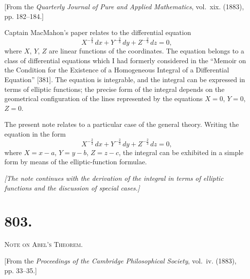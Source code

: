 \documentclass[11pt,a4paper]{book}
\begin{document}
\begin{flushright}
\small[From the \textit{Quarterly Journal of Pure and Applied Mathematics}, vol.~xix. (1883),\\
pp. 182--184.]
\end{flushright}

Captain MacMahon's paper relates to the differential equation
\[
X^{-\frac{2}{3}}\,dx + Y^{-\frac{2}{3}}\,dy + Z^{-\frac{2}{3}}\,dz = 0,
\]
where $X$, $Y$, $Z$ are linear functions of the coordinates. The equation belongs to a class of differential equations which I had formerly considered in the ``Memoir on the Condition for the Existence of a Homogeneous Integral of a Differential Equation'' [381]. The equation is integrable, and the integral can be expressed in terms of elliptic functions; the precise form of the integral depends on the geometrical configuration of the lines represented by the equations $X=0$, $Y=0$, $Z=0$.

The present note relates to a particular case of the general theory. Writing the equation in the form
\[
X^{-\frac{2}{3}}\,dx + Y^{-\frac{2}{3}}\,dy + Z^{-\frac{2}{3}}\,dz = 0,
\]
where $X = x - a$, $Y = y - b$, $Z = z - c$, the integral can be exhibited in a simple form by means of the elliptic-function formulae.

\vspace{0.5cm}
\noindent\textit{[The note continues with the derivation of the integral in terms of elliptic functions and the discussion of special cases.]}
\vspace{0.5cm}



\newpage
\section*{803.}
\begin{center}
{\large\scshape Note on Abel's Theorem.}
\end{center}

\begin{flushright}
\small[From the \textit{Proceedings of the Cambridge Philosophical Society}, vol.~iv. (1883),\\
pp. 33--35.]
\end{flushright}
\end{document}
